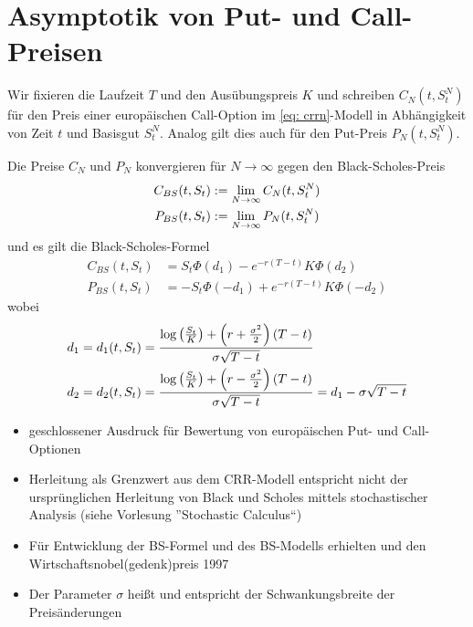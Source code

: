 \section{Asymptotik von Put- und Call-Preisen}

Wir fixieren die Laufzeit $T$ und den Ausübungspreis $K$ und schreiben
$C_N(t,S_t^N)$ für den Preis einer europäischen Call-Option im \eqref{eq: crrn}-Modell in Abhängigkeit von Zeit $t$ und Basisgut $S_t^N$. Analog gilt dies auch für den Put-Preis $P_N(t,S_t^N)$.
\begin{theorem} %
	\label{theorem: 3.3}
	Die Preise $C_N$ und $P_N$ konvergieren für $N \to \infty$ gegen den Black-Scholes-Preis
	\begin{equation*}
		\begin{aligned}
			C_{BS}(t, S_t) &\mathrel{:=} \lim_{N \to \infty} C_N(t,S_t^N) \\
			P_{BS}(t, S_t) &\mathrel{:=} \lim_{N \to \infty} P_N(t, S_t^N)	
		\end{aligned}
	\end{equation*}
	und es gilt die Black-Scholes-Formel
	\begin{equation*}
		\begin{aligned}
			C_{BS}(t,S_t) &= S_t \Phi(d_1) - e^{-r (T-t)} K \Phi(d_2) \\
			P_{BS}(t,S_t) &= - S_t \Phi(- d_1) + e^{-r (T-t)} K \Phi(- d_2)
		\end{aligned}
	\end{equation*}
	wobei
	\begin{equation*}
		\begin{aligned}
			d_1 &= d_1(t,S_t) = \frac{\log\left( \frac{S_t}{K} \right) + \left( r + \frac{\sigma^2}{2} \right) (T - t)}{\sigma \sqrt{T-t}} \\
			d_2 &= d_2(t,S_t) = \frac{\log\left( \frac{S_t}{K} \right) + \left( r - \frac{\sigma^2}{2} \right) (T - t)}{\sigma \sqrt{T-t}}  = d_1 - \sigma \sqrt{T-t}
		\end{aligned}
	\end{equation*}
\end{theorem}

\begin{*bemerkung}
	\begin{itemize}[nolistsep]
		\item geschlossener Ausdruck für Bewertung von europäischen Put- und Call-Optionen
		\item Herleitung als Grenzwert aus dem CRR-Modell entspricht nicht der ursprünglichen Herleitung von Black und Scholes mittels stochastischer Analysis (siehe Vorlesung ''Stochastic Calculus``)
		\item Für Entwicklung der BS-Formel und des BS-Modells erhielten  und  den Wirtschaftsnobel(gedenk)preis 1997
		\item Der Parameter $\sigma$ heißt  und entspricht der Schwankungsbreite der Preisänderungen
	\end{itemize}
\end{*bemerkung}

